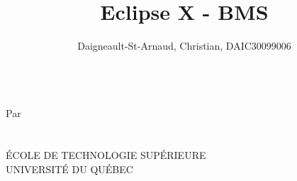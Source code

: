 \documentclass[12pt,letterpaper]{article}
\title{Eclipse X - BMS}
\author{
	Daigneault-St-Arnaud, Christian, DAIC30099006
}
\newcommand{\cours}{ }
\newcommand{\prof}{ }
\begin{document}
	
	\begin{titlepage}
	\makeatletter
		\centering
		\vspace{5cm}
		{\Huge \@title}\\ 
		\vspace{5cm}
		{\large 
			Par \\
			\vspace{0.5cm}
			\@author \\
			\vspace{5cm}
			\@date \\
			\vspace{5cm}
			\'{E}COLE DE TECHNOLOGIE SUP\'{E}RIEURE \\
			UNIVERSIT\'{E} DU QUÉBEC
		}
		\newpage
	\end{titlepage}
	\tableofcontents
	\listoftables
	\listoffigures
	
\end{document}
